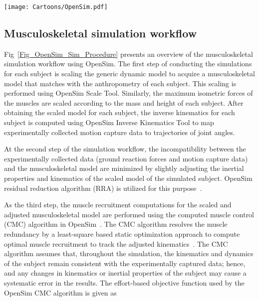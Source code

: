 \documentclass[10pt,letterpaper]{article}
\begin{document}
\begin{figure*}[b!]
	\texttt{[image: Cartoons/OpenSim.pdf]}
	\vspace{-4\baselineskip}
	\caption{\small{\textbf{Block diagram of OpenSim simulation.} Green blocks stand for the outputs, blue blocks represent OpenSim simulations or analyses, purple blocks signify models that have been used for simulations and analyses, and red blocks represent the experimental data.}}
	\label{Fig_OpenSim_Sim_Procedure}
\end{figure*}
\subsection*{Musculoskeletal simulation workflow}

Fig~\ref{Fig_OpenSim_Sim_Procedure} presents an overview of the musculoskeletal simulation workflow using OpenSim. The first step of conducting the simulations for each subject is scaling the generic dynamic model to acquire a musculoskeletal model that matches with the anthropometry of each subject. This scaling is performed using OpenSim Scale Tool. Similarly, the maximum isometric forces of the muscles are scaled according to the mass and height of each subject. After obtaining the scaled model for each subject, the inverse kinematics for each subject is computed using OpenSim Inverse Kinematics Tool to map experimentally collected motion capture data to trajectories of joint angles.

At the second step of the simulation workflow, the incompatibility between the experimentally collected data (ground reaction forces and motion capture data) and the musculoskeletal model are minimized by slightly adjusting the inertial properties and kinematics of the scaled model of the simulated subject. OpenSim residual reduction algorithm (RRA) is utilized for this purpose~\cite{Delp2007}.

As the third step, the muscle recruitment computations for the scaled and adjusted musculoskeletal model are performed using the computed muscle control (CMC) algorithm in OpenSim~\cite{Thelen2003_b}. The CMC algorithm resolves the muscle redundancy by a least-square based static optimization approach to compute  optimal muscle recruitment to track the adjusted kinematics~\cite{Hicks2015}. The CMC algorithm assumes that, throughout  the simulation, the kinematics and dynamics of the subject remain consistent with the experimentally captured data; hence, and any changes in kinematics or inertial properties of the subject may cause a systematic error in the results. The effort-based objective function used by the OpenSim CMC algorithm is given as
\end{document}
